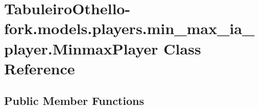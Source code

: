 \hypertarget{class_tabuleiro_othello-fork_1_1models_1_1players_1_1min__max__ia__player_1_1_minmax_player}{}\section{Tabuleiro\+Othello-\/fork.models.\+players.\+min\+\_\+max\+\_\+ia\+\_\+player.\+Minmax\+Player Class Reference}
\label{class_tabuleiro_othello-fork_1_1models_1_1players_1_1min__max__ia__player_1_1_minmax_player}
\subsection*{Public Member Functions}
